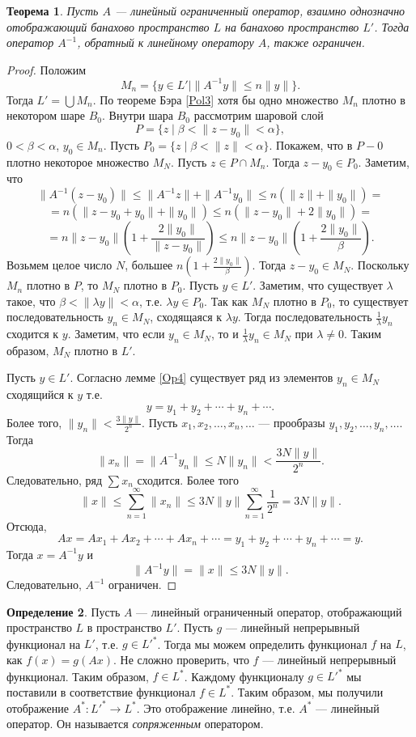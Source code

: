\documentclass[12pt, titlepage, oneside]{amsbook}
\newtheorem{theorem}{Теорема}[chapter]
\theoremstyle{definition}
\newtheorem{definition}[theorem]{Определение}
\theoremstyle{remark}
\begin{document}
\begin{theorem}
\label{Op5}
Пусть $A$  --- линейный ограниченный оператор, взаимно однозначно отображающий банахово пространство $L$ на банахово пространство $L'$. Тогда оператор $A^{-1}$, обратный к линейному оператору $A$, также ограничен.
\end{theorem}

\begin{proof}
Положим $$M_n=\{y\in L'\mid \|A^{-1}y\|\leq n\|y\|\}.$$ Тогда $L'=\bigcup M_n$. По теореме Бэра \ref{Pol3} хотя бы одно множество $M_n$ плотно в некотором шаре $B_0$. Внутри шара $B_0$ рассмотрим шаровой слой $$P=\{z\mid\beta<\|z-y_0\|<\alpha\},$$ $0<\beta<\alpha$, $y_0\in M_n$. Пусть $P_0=\{z\mid\beta<\|z\|<\alpha\}.$ Покажем, что в $P-0$ плотно некоторое множество $M_N$. Пусть $z\in P\cap M_n$. Тогда $z-y_0\in P_0$. Заметим, что $$\|A^{-1}(z-y_0)\|\leq \|A^{-1}z\|+\|A^{-1}y_0\|\leq n(\|z\|+\|y_0\|)=$$ $$=n(\|z-y_0+y_0\|+\|y_0\|)\leq n(\|z-y_0\|+2\|y_0\|)=$$ $$=n\|z-y_0\|\left(1+\frac{2\|y_0\|}{\|z-y_0\|}\right)\leq n\|z-y_0\|\left(1+\frac{2\|y_0\|}{\beta}\right).$$ Возьмем целое число $N$, большее $n\left(1+\frac{2\|y_0\|}{\beta}\right).$ Тогда $z-y_0\in M_N$. Поскольку $M_n$ плотно в $P$, то $M_N$ плотно в $P_0$. Пусть $y\in L'$. Заметим, что существует $\lambda$ такое, что $\beta<\|\lambda y\|<\alpha$, т.е. $\lambda y\in P_0$. Так как $M_N$ плотно в $P_0$, то существует последовательность $y_n\in M_N$, сходящаяся к $\lambda y$. Тогда последовательность $\frac{1}{\lambda}y_n$ сходится к $y$. Заметим, что если $y_n\in M_N$, то и $\frac{1}{\lambda}y_n\in M_N$ при $\lambda\neq 0$. Таким образом, $M_N$ плотно в $L'$.

Пусть $y\in L'$. Согласно лемме \ref{Op4} существует ряд из элементов $y_n\in M_N$ сходящийся к $y$ т.е. $$y=y_1+y_2+\cdots+y_n+\cdots.$$ Более того, $\|y_n\|<\frac{3\|y\|}{2^n}$. Пусть $x_1,x_2,\ldots,x_n,\ldots$ --- прообразы $y_1,y_2,\ldots,y_n,\ldots$. Тогда $$\|x_n\|=\|A^{-1}y_n\|\leq N\|y_n\|<\frac{3N\|y\|}{2^n}.$$ Следовательно, ряд $\sum x_n$ сходится. Более того $$\|x\|\leq\sum\limits_{n=1}^{\infty}\|x_n\|\leq 3N\|y\|\sum\limits_{n=1}^{\infty}\frac{1}{2^n}=3N\|y\|.$$ Отсюда, $$Ax=Ax_1+Ax_2+\cdots+Ax_n+\cdots=y_1+y_2+\cdots+y_n+\cdots=y.$$ Тогда $x=A^{-1}y$ и $$\|A^{-1}y\|=\|x\|\leq 3N\|y\|.$$ Следовательно, $A^{-1}$ ограничен.
\end{proof}

 \begin{definition}
Пусть $A$  --- линейный ограниченный оператор, отображающий пространство $L$ в пространство $L'$. Пусть $g$ --- линейный непрерывный функционал на $L'$, т.е. $g\in L'^*$. Тогда мы можем определить функционал $f$ на $L$, как $f(x)=g(Ax)$. Не сложно проверить, что $f$ --- линейный непрерывный функционал. Таким образом, $f\in L^*$. Каждому функционалу $g\in L'^*$ мы поставили в соответствие функционал $f\in L^*$. Таким образом, мы получили отображение $A^*\colon L'^*\rightarrow L^*$. Это отображение линейно, т.е. $A^*$ --- линейный оператор. Он называется \emph{сопряженным} оператором.
\end{definition}
\end{document}

